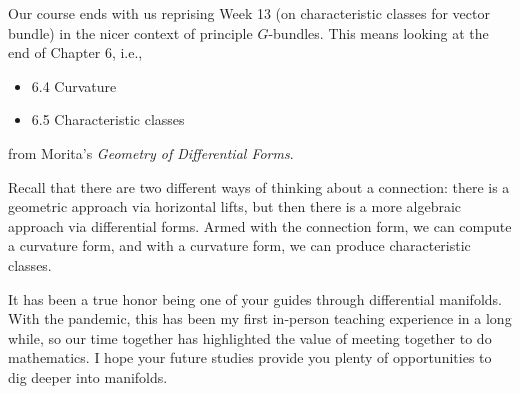 \documentclass{homework}
\author{Jim Fowler}
\date{Week 16: Curvature}
\begin{document}
\maketitle

Our course ends with us reprising Week 13 (on characteristic classes
for vector bundle) in the nicer context of principle $G$-bundles.  This
means looking at the end of Chapter 6, i.e.,
\begin{itemize}
\item 6.4 Curvature
\item 6.5 Characteristic classes
\end{itemize}
from Morita's \textit{Geometry of Differential Forms}.

Recall that there are two different ways of thinking about a
connection: there is a geometric approach via horizontal lifts, but
then there is a more algebraic approach via differential forms.  Armed
with the connection form, we can compute a curvature form, and with a
curvature form, we can produce characteristic classes.

It has been a true honor being one of your guides through differential
manifolds.  With the pandemic, this has been my first in-person
teaching experience in a long while, so our time together has
highlighted the value of meeting together to do mathematics.  I hope
your future studies provide you plenty of opportunities to dig deeper
into manifolds.
\end{document}
